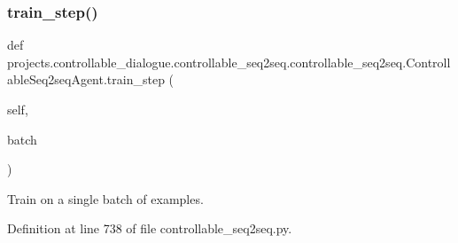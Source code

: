 \subsubsection{\texorpdfstring{train\+\_\+step()}{train\_step()}}
{\footnotesize\ttfamily def projects.\+controllable\+\_\+dialogue.\+controllable\+\_\+seq2seq.\+controllable\+\_\+seq2seq.\+Controllable\+Seq2seq\+Agent.\+train\+\_\+step (\begin{DoxyParamCaption}\item[{}]{self,  }\item[{}]{batch }\end{DoxyParamCaption})}

\begin{DoxyVerb}Train on a single batch of examples.
\end{DoxyVerb}
 

Definition at line 738 of file controllable\+\_\+seq2seq.\+py.


